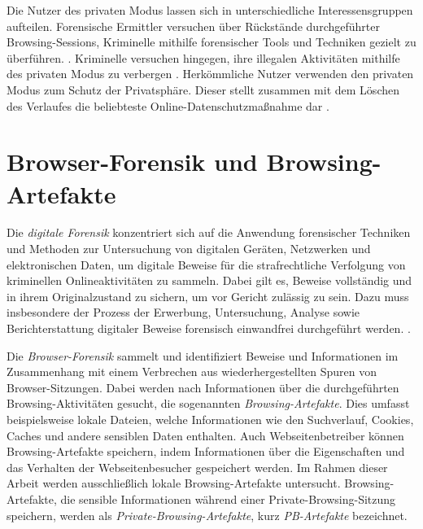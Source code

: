 Die Nutzer des privaten Modus lassen sich in unterschiedliche Interessensgruppen aufteilen. 
Forensische Ermittler versuchen über Rückstände durchgeführter Browsing-Sessions, Kriminelle mithilfe forensischer Tools und Techniken gezielt zu überführen. \cite{Montasari.2015}. Kriminelle versuchen hingegen, ihre illegalen Aktivitäten mithilfe des privaten Modus zu verbergen \cite{Mahlous.2020}. 
Herkömmliche Nutzer verwenden den privaten Modus zum Schutz der Privatsphäre. Dieser stellt zusammen mit dem Löschen des Verlaufes die beliebteste Online-Datenschutzmaßnahme dar \cite{Horsman.2019}. 

\section{Browser-Forensik und Browsing-Artefakte}\label{chap:theorie-browser-forensics-artefakte} %

Die \textit{digitale Forensik} konzentriert sich auf die Anwendung forensischer Techniken und Methoden zur Untersuchung von digitalen Geräten, Netzwerken und elektronischen Daten, um digitale Beweise für die strafrechtliche Verfolgung von kriminellen Onlineaktivitäten zu sammeln.
Dabei gilt es, Beweise vollständig und in ihrem Originalzustand zu sichern, um vor Gericht zulässig zu sein. Dazu muss insbesondere der Prozess der Erwerbung, Untersuchung, Analyse sowie Berichterstattung digitaler Beweise forensisch einwandfrei durchgeführt werden.  \cite{Izzati.2022}.

Die \textit{Browser-Forensik} sammelt und identifiziert Beweise und Informationen im Zusammenhang mit einem Verbrechen aus wiederhergestellten Spuren von Browser-Sitzungen. 
Dabei werden nach Informationen über die durchgeführten Browsing-Aktivitäten gesucht, die sogenannten \textit{Browsing-Artefakte}. 
Dies umfasst beispielsweise lokale Dateien, welche Informationen wie den Suchverlauf, Cookies, Caches und andere sensiblen Daten enthalten. Auch Webseitenbetreiber können Browsing-Artefakte speichern, indem Informationen über die Eigenschaften und das Verhalten der Webseitenbesucher gespeichert werden. Im Rahmen dieser Arbeit werden ausschließlich lokale Browsing-Artefakte untersucht. \cite{Izzati.2022}
Browsing-Artefakte, die sensible Informationen während einer Private-Browsing-Sitzung speichern, werden als \textit{Private-Browsing-Artefakte}, kurz \textit{PB-Artefakte} bezeichnet.

